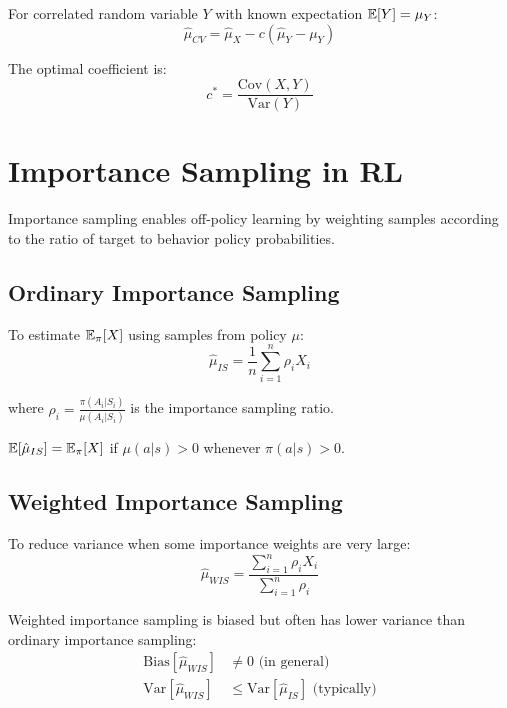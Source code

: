 For correlated random variable $Y$ with known expectation $\mathbb{E}[Y] = \mu_Y$:
\begin{equation}
\hat{\mu}_{CV} = \hat{\mu}_X - c(\hat{\mu}_Y - \mu_Y)
\end{equation}

The optimal coefficient is:
\begin{equation}
c^* = \frac{\text{Cov}(X,Y)}{\text{Var}(Y)}
\end{equation}

\section{Importance Sampling in RL}

Importance sampling enables off-policy learning by weighting samples according to the ratio of target to behavior policy probabilities.

\subsection{Ordinary Importance Sampling}

To estimate $\mathbb{E}_\pi[X]$ using samples from policy $\mu$:
\begin{equation}
\hat{\mu}_{IS} = \frac{1}{n} \sum_{i=1}^n \rho_i X_i
\end{equation}

where $\rho_i = \frac{\pi(A_i|S_i)}{\mu(A_i|S_i)}$ is the importance sampling ratio.

\begin{theorem}
$\mathbb{E}[\hat{\mu}_{IS}] = \mathbb{E}_\pi[X]$ if $\mu(a|s) > 0$ whenever $\pi(a|s) > 0$.
\end{theorem}

\subsection{Weighted Importance Sampling}

To reduce variance when some importance weights are very large:
\begin{equation}
\hat{\mu}_{WIS} = \frac{\sum_{i=1}^n \rho_i X_i}{\sum_{i=1}^n \rho_i}
\end{equation}

\begin{theorem}
Weighted importance sampling is biased but often has lower variance than ordinary importance sampling:
\begin{align}
\text{Bias}[\hat{\mu}_{WIS}] &\neq 0 \text{ (in general)} \\
\text{Var}[\hat{\mu}_{WIS}] &\leq \text{Var}[\hat{\mu}_{IS}] \text{ (typically)}
\end{align}
\end{theorem}

